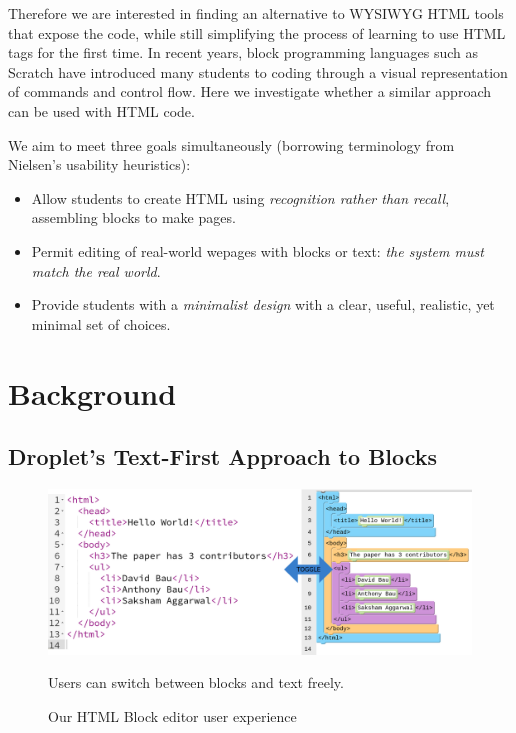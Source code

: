 \documentclass[conference]{IEEEtran}
\begin{document}
Therefore we are interested in finding an alternative to WYSIWYG HTML tools that expose the code, while still simplifying the process of learning to use HTML tags for the first time.  In recent years, block programming languages such as Scratch \cite{Scratch} have introduced many students to coding through a visual representation of commands and control flow.  Here we investigate whether a similar approach can be used with HTML code.

We aim to meet three goals simultaneously (borrowing terminology from Nielsen's usability heuristics\cite{Nielsen}):

\begin{itemize}
\item Allow students to create HTML using \emph{recognition rather than recall}, assembling blocks to make pages.
\item Permit editing of real-world wepages with blocks or text: \emph{the system must match the real world}.
\item Provide students with a \emph{minimalist design} with a clear, useful, realistic, yet minimal set of choices.
\end{itemize}


\section{Background}

\subsection{Droplet's Text-First Approach to Blocks}

\begin{figure}
\centering
\includegraphics[width=\columnwidth]{dualmode.png}
\caption{Our HTML Block editor user experience}
\small
\begin{flushleft}
Users can switch between blocks and text freely.
\end{flushleft}
\label{dropletimage}
\end{figure}
\end{document}
